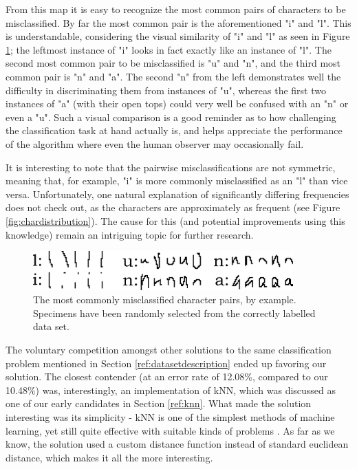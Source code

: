 \documentclass{netsec2012}
\begin{document}
From this map it is easy to recognize the most common pairs of characters to be misclassified.  By
far the most common pair is the aforementioned "i" and "l".  This is understandable, considering the
visual similarity of "i" and "l" as seen in Figure \ref{fig:charpairs}; the leftmost instance of "i"
looks in fact exactly like an instance of "l".  The second most common pair to be misclassified is
"u" and "n", and the third most common pair is "n" and "a".  The second "n" from the left
demonstrates well the difficulty in discriminating them from instances of "u", whereas the first two
instances of "a" (with their open tops) could very well be confused with an "n" or even a "u".  Such
a visual comparison is a good reminder as to how challenging the classification task at hand
actually is, and helps appreciate the performance of the algorithm where even the human observer may
occasionally fail.

It is interesting to note that the pairwise misclassifications are not symmetric, meaning that, for
example, "i" is more commonly misclassified as an "l" than vice versa.  Unfortunately, one natural
explanation of significantly differing frequencies does not check out, as the characters are
approximately as frequent (see Figure \ref{fig:chardistribution}).  The cause for this (and
potential improvements using this knowledge) remain an intriguing topic for further research.

\begin{figure}[t]
\centering
\includegraphics[width=100mm]{pairs.png}
\caption{The most commonly misclassified character pairs, by example.  Specimens have been randomly
selected from the correctly labelled data set.}
\label{fig:charpairs}
\end{figure}

\label{ref:datachallenge}

The voluntary competition amongst other solutions to the same classification problem mentioned in
Section \ref{ref:datasetdescription} ended up favoring our solution.  The closest contender (at an
error rate of 12.08\%, compared to our 10.48\%) was, interestingly, an implementation of kNN, which
was discussed as one of our early candidates in Section \ref{ref:knn}.  What made the solution
interesting was its simplicity - kNN is one of the simplest methods of machine learning, yet still
quite effective with suitable kinds of problems \cite{keller1985fuzzy}.  As far as we know, the
solution used a custom distance function instead of standard euclidean distance, which makes it all
the more interesting.
\end{document}
